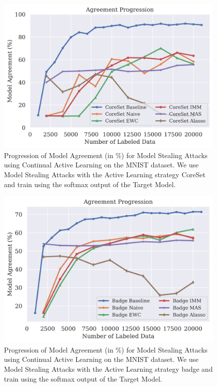 \begin{figure}[h]
    \centering
    \includegraphics[width=0.7\linewidth]{images/results_CALMS/mnist_softmax_coreset.png}
    \caption[Agreement Comparison for Model Stealing on MNIST using the softmax output and the Active Learning strategy CoreSet]{Progression of Model Agreement
    (in \%) for Model Stealing Attacks using Continual Active Learning on the MNIST dataset. We use Model Stealing Attacks with the Active Learning strategy
    CoreSet and train using the softmax output of the Target Model.}
    \label{fig:CALMSMNISTSoftmaxCoreSet}
\end{figure}

\begin{figure}[h]
    \centering
    \includegraphics[width=0.7\linewidth]{images/results_CALMS/cifar_softmax_badge.png}
    \caption[Agreement Comparison for Model Stealing on MNIST using the softmax output and the Active Learning strategy Badge]{Progression of Model Agreement
    (in \%) for Model Stealing Attacks using Continual Active Learning on the MNIST dataset. We use Model Stealing Attacks with the Active Learning strategy
    \gls{badge} and train using the softmax output of the Target Model.}
    \label{fig:CALMSMNISTSoftmaxBadge}
\end{figure}

